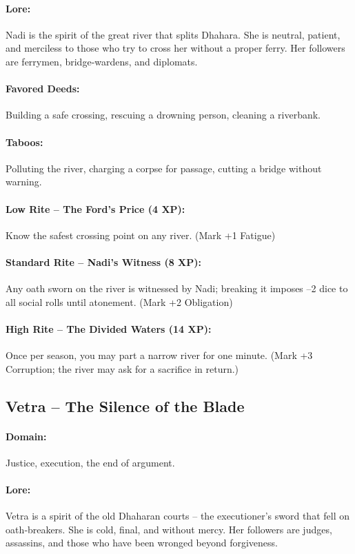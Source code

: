 \documentclass[11pt]{book}
\begin{document}
\paragraph{Lore:} Nadi is the spirit of the great river that splits Dhahara. She is neutral, patient, and merciless to those who try to cross her without a proper ferry. Her followers are ferrymen, bridge‑wardens, and diplomats.
\paragraph{Favored Deeds:} Building a safe crossing, rescuing a drowning person, cleaning a riverbank.
\paragraph{Taboos:} Polluting the river, charging a corpse for passage, cutting a bridge without warning.
\paragraph{Low Rite -- The Ford's Price (4 XP):} Know the safest crossing point on any river. (Mark +1 Fatigue)
\paragraph{Standard Rite -- Nadi's Witness (8 XP):} Any oath sworn on the river is witnessed by Nadi; breaking it imposes --2 dice to all social rolls until atonement. (Mark +2 Obligation)
\paragraph{High Rite -- The Divided Waters (14 XP):} Once per season, you may part a narrow river for one minute. (Mark +3 Corruption; the river may ask for a sacrifice in return.)

\subsection{Vetra -- The Silence of the Blade}
\paragraph{Domain:} Justice, execution, the end of argument.
\paragraph{Lore:} Vetra is a spirit of the old Dhaharan courts -- the executioner's sword that fell on oath‑breakers. She is cold, final, and without mercy. Her followers are judges, assassins, and those who have been wronged beyond forgiveness.
\end{document}
